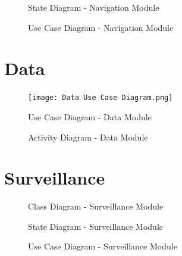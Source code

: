 \documentclass[english]{article}
\begin{document}
        \begin{figure}[H]
            \centering	            \centerline{}
            \caption{State Diagram - Navigation Module}
        \end{figure}

        \begin{figure}[H]
            \centering	            \centerline{}
            \caption{Use Case Diagram - Navigation Module}
        \end{figure}

    \section{Data}
        \begin{figure}[H]
            \centering	            \centerline{\texttt{[image: Data Use Case Diagram.png]}}
            \caption{Use Case Diagram - Data Module}
        \end{figure}

        \begin{figure}[H]
            \centering	            \centerline{}
            \caption{Activity Diagram - Data Module}
        \end{figure}

    \section{Surveillance}
        \begin{figure}[H]
            \centering	            \centerline{}
            \caption{Class Diagram - Surveillance Module}
        \end{figure}

        \begin{figure}[H]
            \centering	            \centerline{}
            \caption{State Diagram - Surveillance Module}
        \end{figure}

        \begin{figure}[H]
            \centering	            \centerline{}
            \caption{Use Case Diagram - Surveillance Module}
        \end{figure}
\end{document}
